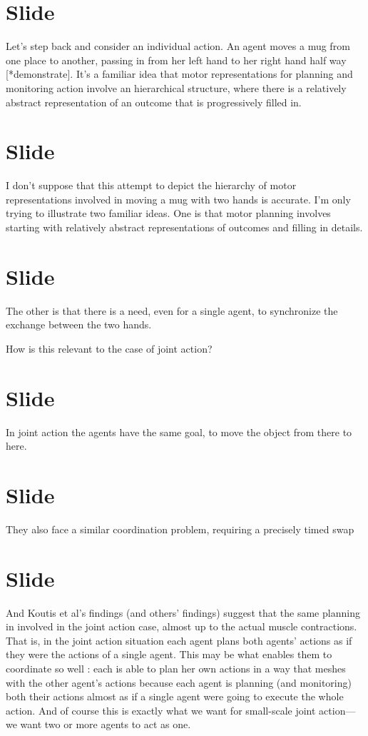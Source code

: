 \documentclass[12pt,\papersize]{extarticle}
\begin{document}
\section{Slide}
Let’s step back and consider an individual action.
An agent moves a mug from one place to another, passing in from her left hand to her right hand half way [*demonstrate].
It’s a familiar idea that motor representations for planning and monitoring action involve an hierarchical structure,
where there is a relatively abstract representation of an outcome that is progressively filled in.




\section{Slide}
I don’t suppose that this attempt to depict the hierarchy of motor representations involved in moving a mug with two hands is accurate.
I’m only trying to illustrate two familiar ideas.
One is that motor planning involves starting with relatively abstract representations of outcomes and filling in details.




\section{Slide}
The other is that there is a need, even for a single agent, to synchronize the exchange between the two hands.

How is this relevant to the case of joint action?



\section{Slide}
In joint action the agents have the same goal, to move the object from there to here.



\section{Slide}
They also face a similar coordination problem, requiring a precisely timed swap



\section{Slide}
And Koutis et al’s findings (and others’ findings) suggest that the same planning in involved in the joint action case, almost up to the actual muscle contractions.
That is, in the joint action situation each agent plans both agents’ actions as if they were the actions of a single agent.
This may be what enables them to coordinate so well : each is able to plan her own actions in a way that meshes with the other agent’s actions because each agent is planning (and monitoring) both their actions almost as if a single agent were going to execute the whole action.
And of course this is exactly what we want for small-scale joint action---we want two or more agents to act as one.
\end{document}
